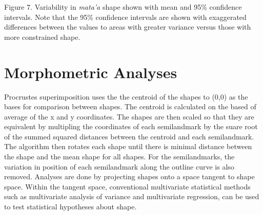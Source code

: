 \documentclass[]{article}
\begin{document}
 Figure 7. Variability in \emph{mata'a} shape shown with mean and 95\%
confidence intervals. Note that the 95\% confidence intervals are shown
with exaggerated differences between the values to areas with greater
variance versus those with more constrained shape.

\section{Morphometric Analyses}\label{morphometric-analyses}

Procrustes superimposition uses the the centroid of the shapes to (0,0)
as the bases for comparison between shapes. The centroid is calculated
on the based of average of the x and y coordinates. The shapes are then
scaled so that they are equivalent by multipling the coordinates of each
semilandmark by the suare root of the summed squared distances between
the centroid and each semilandmark. The algorithm then rotates each
shape until there is minimal distance between the shape and the mean
shape for all shapes. For the semilandmarks, the variation in position
of each semilandmark along the outline curve is also removed. Analyses
are done by projecting shapes onto a space tangent to shape space.
Within the tangent space, conventional multivariate statistical methods
such as multivariate analysis of variance and multivariate regression,
can be used to test statistical hypotheses about shape.
\end{document}

